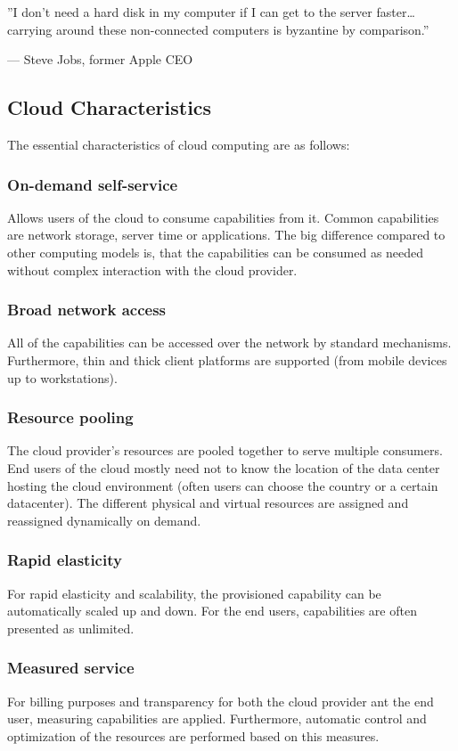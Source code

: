 \epigraph{''I don’t need a hard disk in my computer if I can get to the server faster\dots \\ carrying around these non-connected computers is byzantine by comparison.''}{--- \textup{Steve Jobs}, former Apple CEO}

\subsection{Cloud Characteristics}
The essential characteristics of cloud computing are as follows\cite{cloud_characteristics}\cite{nist}:

\subsubsection{On-demand self-service}
Allows users of the cloud to consume capabilities from it. Common capabilities are network storage, server time or applications. The big difference compared to other computing models is, that the capabilities can be consumed as needed without complex interaction with the cloud provider. 

\subsubsection{Broad network access}
All of the capabilities can be accessed over the network by standard mechanisms. Furthermore, thin and thick client platforms are supported (from mobile devices up to workstations).

\subsubsection{Resource pooling}
The cloud provider's resources are pooled together to serve multiple consumers. End users of the cloud mostly need not to know the location of the data center hosting the cloud environment (often users can choose the country or a certain datacenter). The different physical and virtual resources are assigned and reassigned dynamically on demand.

\subsubsection{Rapid elasticity}
For rapid elasticity and scalability, the provisioned capability can be automatically scaled up and down. For the end users, capabilities are often presented as unlimited.

\subsubsection{Measured service}
For billing purposes and transparency for both the cloud provider ant the end user, measuring capabilities are applied. Furthermore, automatic control and optimization of the resources are performed based on this measures.

